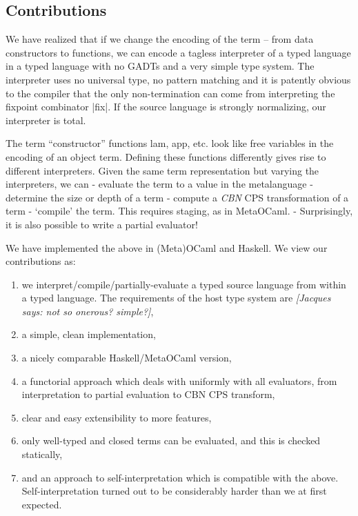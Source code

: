 \documentclass[preprint]{sigplanconf}
\newcommand{\jacques}[1]{{\it [Jacques says: #1]}}
\begin{document}
\subsection{Contributions}\label{contributions}

   We have realized that if we change the encoding of the term --
from data constructors to functions, we can encode a tagless
interpreter of a typed language in a typed language with no GADTs and
a very simple type system. The interpreter uses no universal type, no
pattern matching and it is patently obvious to the compiler that the
only non-termination can come from interpreting the fixpoint
combinator |fix|. If the source
language is strongly normalizing, our interpreter is total.

The term ``constructor'' functions lam, app, etc. look like free
variables in the encoding of an object term.  Defining these functions
differently gives rise to different interpreters.  Given the same term
representation but varying the interpreters, we can
	- evaluate the term to a value in the metalanguage
	- determine the size or depth of a term
    - compute a \emph{CBN} CPS transformation of a term
	- `compile' the term. This requires staging, as in MetaOCaml.
	- Surprisingly, it is also possible to write a partial evaluator! 

\noindent We have implemented the above in (Meta)OCaml and Haskell.
We view our contributions as:
\begin{enumerate}
\item we interpret/compile/partially-evaluate a typed source language
   from within a typed language.  The requirements of the host type
   system are \jacques{not so onerous?  simple?},
\item a simple, clean implementation,
\item a nicely comparable Haskell/MetaOCaml version,
\item a functorial approach which deals with uniformly with all
evaluators, from interpretation to partial evaluation to CBN CPS transform,
\item clear and easy extensibility to more features,
\item only well-typed and closed terms can be evaluated, and this is 
checked statically,
\item and an approach to self-interpretation which is compatible with the
  above.  Self-interpretation turned out to be considerably harder than
  we at first expected.
\end{enumerate}
\end{document}
